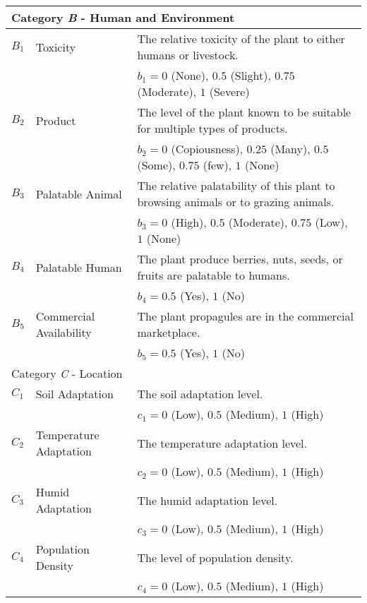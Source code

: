 \documentclass[12pt]{article}
\begin{document}
{{\begin{longtable}{p{0.2in}p{1.5in}p{4.3in}}
				\midrule
				\multicolumn{3}{l}{Category \textit{B} - Human and Environment}  \\
				\midrule
				
				$B_1$ & Toxicity & The relative toxicity of the plant to either humans or livestock.\\
					&& $b_1=0$ (None), $0.5$ (Slight), $0.75$ (Moderate), $1$ (Severe)\\
				$B_2$ & Product & The level of the plant known to be suitable for multiple types of products.\\
					&& $b_2=0$ (Copiousness), $0.25$ (Many), $0.5$ (Some), $0.75$ (few), $1$ (None)\\
				$B_3$ & Palatable Animal & The relative palatability of this plant to browsing animals or to grazing animals.\\
					&& $b_3=0$ (High), $0.5$ (Moderate), $0.75$ (Low), $1$ (None)\\
				$B_4$ & Palatable Human & The plant produce berries, nuts, seeds, or fruits are palatable to humans. \\
					&& $b_4=0.5$ (Yes), $1$ (No)\\
				$B_5$ & Commercial Availability & The plant propagules are in the commercial marketplace. \\
					&& $b_5=0.5$ (Yes), $1$ (No)\\
			
				\midrule
				\multicolumn{3}{l}{Category \textit{C} - Location}  \\
				\midrule
				
				$C_1$ & Soil Adaptation & The soil adaptation level.\\
				&& $c_1=0$ (Low), $0.5$ (Medium), $1$ (High)\\
				$C_2$ & Temperature Adaptation & The temperature adaptation level.\\
				&& $c_2=0$ (Low), $0.5$ (Medium), $1$ (High)\\
				$C_3$ & Humid Adaptation & The humid adaptation level.\\
				&& $c_3=0$ (Low), $0.5$ (Medium), $1$ (High)\\
				$C_4$ & Population Density & The level of population density.\\
				&& $c_4=0$ (Low), $0.5$ (Medium), $1$ (High)\\
			
				\bottomrule
			
			\end{longtable}
			}
		}
		\newpage
		
\end{document}
